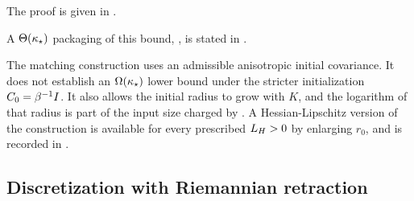 The proof is given in .

A $\Theta(\kappa_\star)$ packaging of this bound, , is stated in
.

The matching construction uses an admissible anisotropic initial covariance. It does not
establish an $\Omega(\kappa_\star)$ lower bound under the stricter initialization
$C_0=\beta^{-1}I$. It also allows the initial radius to grow with $K$, and the logarithm
of that radius is part of the input size charged by . A
Hessian-Lipschitz version of the construction is available for every prescribed
$L_H>0$ by enlarging $r_0$, and is recorded in .

\subsection{Discretization with Riemannian retraction}

